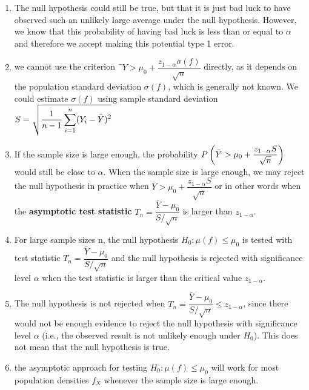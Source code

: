\begin{enumerate}
    \item The null hypothesis could still be true, but that it is just bad luck to have observed such an unlikely large average under the null hypothesis.
    However, we know that this probability of having bad luck is less than or equal to $\alpha$ and therefore we accept making this potential type 1 error.
    \hfill \cite{statistics/book/Statistics-for-Data-Scientists/Maurits-Kaptein}

    \item we cannot use the criterion ¯$Y > \mu_0 + \dfrac{z_{1-\alpha} \sigma( f )}{\sqrt{n}}$ directly, as it depends on the population standard deviation $\sigma( f )$, which is generally not known.
    We could estimate $\sigma( f )$ using sample standard deviation $S = \sqrt{\dfrac{1}{n-1} \displaystyle\sum^n_{i=1} (Y_i - \bar{Y} )^2}$
    \hfill \cite{statistics/book/Statistics-for-Data-Scientists/Maurits-Kaptein}

    \item If the sample size is large enough, the probability $P\left(\bar{Y} > \mu_0 + \dfrac{z_{1-\alpha} S}{\sqrt{n}}\right)$ would still be close to $\alpha$.
    When the sample size is large enough, we may reject the null hypothesis in practice when $\bar{Y} > \mu_0 + \dfrac{z_{1-\alpha} S}{\sqrt{n}}$ or in other words when the \textbf{asymptotic test statistic} $T_n = \dfrac{\bar{Y} - \mu_0}{S/\sqrt{n}}$ is larger than $z_{1-\alpha}$.
    \hfill \cite{statistics/book/Statistics-for-Data-Scientists/Maurits-Kaptein}

    \item For large sample sizes n, the null hypothesis $H_0 : \mu( f ) \leq \mu_0$ is tested with test statistic $T_n = \dfrac{\bar{Y} - \mu_0}{S/\sqrt{n}}$ and the null hypothesis is rejected with significance level $\alpha$ when the test statistic is larger than the critical value $z_{1-\alpha}$.
    \hfill \cite{statistics/book/Statistics-for-Data-Scientists/Maurits-Kaptein}

    \item The null hypothesis is not rejected when $T_n = \dfrac{\bar{Y} - \mu_0}{S/\sqrt{n}} \leq z_{1-\alpha}$, since there would not be enough evidence to reject the null hypothesis with significance level $\alpha$ (i.e., the observed result is not unlikely enough under $H_0 $).
    This does not mean that the null hypothesis is true.
    \hfill \cite{statistics/book/Statistics-for-Data-Scientists/Maurits-Kaptein}

    \item the asymptotic approach for testing $H_0 : \mu( f ) \leq \mu_0$ will work for most population densities $f_X$ whenever the sample size is large enough.
    \hfill \cite{statistics/book/Statistics-for-Data-Scientists/Maurits-Kaptein}


\end{enumerate}

